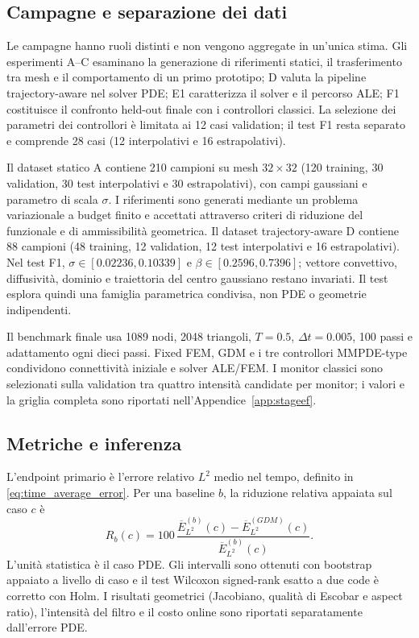 \subsection{Campagne e separazione dei dati}

Le campagne hanno ruoli distinti e non vengono aggregate in un'unica stima. Gli esperimenti A--C esaminano la generazione di riferimenti statici, il trasferimento tra mesh e il comportamento di un primo prototipo; D valuta la pipeline trajectory-aware nel solver PDE; E1 caratterizza il solver e il percorso ALE; F1 costituisce il confronto held-out finale con i controllori classici. La selezione dei parametri dei controllori è limitata ai 12 casi validation; il test F1 resta separato e comprende 28 casi (12 interpolativi e 16 estrapolativi).

Il dataset statico A contiene 210 campioni su mesh $32\times32$ (120 training, 30 validation, 30 test interpolativi e 30 estrapolativi), con campi gaussiani e parametro di scala $\sigma$. I riferimenti sono generati mediante un problema variazionale a budget finito e accettati attraverso criteri di riduzione del funzionale e di ammissibilità geometrica. Il dataset trajectory-aware D contiene 88 campioni (48 training, 12 validation, 12 test interpolativi e 16 estrapolativi). Nel test F1, $\sigma\in[0.02236,0.10339]$ e $\beta\in[0.2596,0.7396]$; vettore convettivo, diffusività, dominio e traiettoria del centro gaussiano restano invariati. Il test esplora quindi una famiglia parametrica condivisa, non PDE o geometrie indipendenti.

Il benchmark finale usa 1089 nodi, 2048 triangoli, $T=0.5$, $\Delta t=0.005$, 100 passi e adattamento ogni dieci passi. Fixed FEM, GDM e i tre controllori MMPDE-type condividono connettività iniziale e solver ALE/FEM. I monitor classici sono selezionati sulla validation tra quattro intensità candidate per monitor; i valori e la griglia completa sono riportati nell'Appendice~\ref{app:stageef}.

\subsection{Metriche e inferenza}

L'endpoint primario è l'errore relativo $L^2$ medio nel tempo, definito in \eqref{eq:time_average_error}. Per una baseline $b$, la riduzione relativa appaiata sul caso $c$ è
\begin{equation}
R_b(c)=100\,\frac{\overline E_{L^2}^{(b)}(c)-\overline E_{L^2}^{(GDM)}(c)}{\overline E_{L^2}^{(b)}(c)}.
\end{equation}
L'unità statistica è il caso PDE. Gli intervalli sono ottenuti con bootstrap appaiato a livello di caso e il test Wilcoxon signed-rank esatto a due code è corretto con Holm. I risultati geometrici (Jacobiano, qualità di Escobar e aspect ratio), l'intensità del filtro e il costo online sono riportati separatamente dall'errore PDE.

